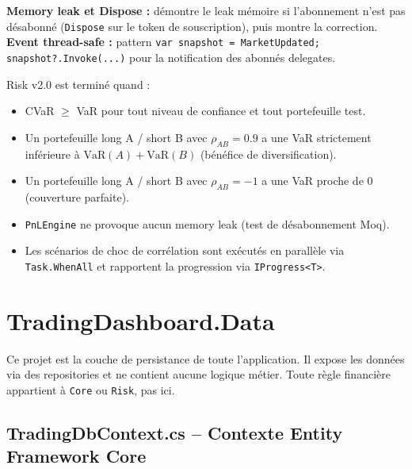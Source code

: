 \documentclass[a4paper,11pt]{article}
\newcommand{\cs}[1]{\texttt{\color{codeinline}#1}}
\begin{document}
\begin{tcolorbox}[constraint]
\textbf{Memory leak et Dispose :} d\'emontre le leak m\'emoire si l'abonnement n'est
pas d\'esabonné (\cs{Dispose} sur le token de souscription), puis montre la correction.\\[4pt]
\textbf{Event thread-safe :} pattern \cs{var snapshot = MarketUpdated; snapshot?.Invoke(...)}
pour la notification des abonn\'es delegates.
\end{tcolorbox}

\begin{tcolorbox}[deliverable]
Risk v2.0 est termin\'e quand :
\begin{itemize}[leftmargin=1.5em]
  \item CVaR $\ge$ VaR pour tout niveau de confiance et tout portefeuille test.
  \item Un portefeuille long A / short B avec $\rho_{AB} = 0.9$ a une VaR
        strictement inf\'erieure \`a $\text{VaR}(A) + \text{VaR}(B)$
        (b\'en\'efice de diversification).
  \item Un portefeuille long A / short B avec $\rho_{AB} = -1$ a une VaR proche de 0
        (couverture parfaite).
  \item \cs{PnLEngine} ne provoque aucun memory leak (test de d\'esabonnement Moq).
  \item Les sc\'enarios de choc de corr\'elation sont ex\'ecut\'es en parall\`ele
        via \cs{Task.WhenAll} et rapportent la progression via \cs{IProgress<T>}.
\end{itemize}
\end{tcolorbox}

\newpage
\section{TradingDashboard.Data}

\begin{tcolorbox}[note]
Ce projet est la couche de persistance de toute l'application. Il expose les données
via des repositories et ne contient aucune logique métier. Toute règle financière
appartient à \texttt{Core} ou \texttt{Risk}, pas ici.
\end{tcolorbox}

\subsection{TradingDbContext.cs -- Contexte Entity Framework Core}
\end{document}
